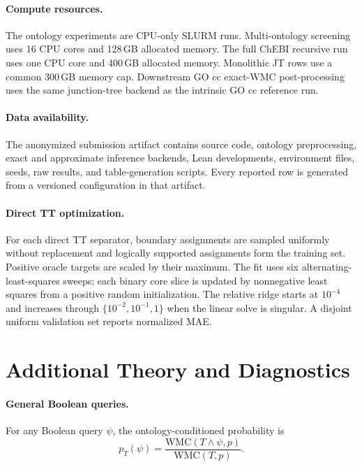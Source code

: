 \documentclass[letterpaper]{article}
\newif\ifincludesupplement
\begin{document}
\paragraph{Compute resources.}
The ontology experiments are CPU-only SLURM runs. Multi-ontology screening
uses 16 CPU cores and 128\,GB allocated memory. The full ChEBI recursive
run uses one CPU core and 400\,GB allocated memory. Monolithic JT rows use
a common 300\,GB memory cap. Downstream GO cc exact-WMC post-processing uses
the same junction-tree backend as the intrinsic GO cc reference run.

\paragraph{Data availability.}
The anonymized submission artifact contains source code, ontology
preprocessing, exact and approximate inference backends, Lean developments,
environment files, seeds, raw results, and table-generation scripts. Every
reported row is generated from a versioned configuration in that artifact.

\paragraph{Direct TT optimization.}
\label{app:direct-tt-optimization}
For each direct TT separator, boundary assignments are sampled uniformly
without replacement and logically supported assignments form the training
set. Positive oracle targets are scaled by their maximum. The fit uses six
alternating-least-squares sweeps; each binary core slice is updated by
nonnegative least squares from a positive random initialization. The
relative ridge starts at \(10^{-4}\) and increases through
\(\{10^{-2},10^{-1},1\}\) when the linear solve is singular. A disjoint
uniform validation set reports normalized MAE.
\fi



\ifincludesupplement
\appendix

\section{Additional Theory and Diagnostics}
\label{app:additional-theory}

\paragraph{General Boolean queries.}
For any Boolean query \(\psi\), the ontology-conditioned probability is
\[
p_T(\psi)
=
\frac{\mathrm{WMC}(T\wedge \psi,p)}
     {\mathrm{WMC}(T,p)}.
\]
\end{document}
